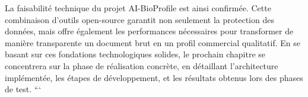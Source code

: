 La faisabilité technique du projet AI-BioProfile est ainsi confirmée. Cette combinaison d'outils open-source garantit non seulement la protection des données, mais offre également les performances nécessaires pour transformer de manière transparente un document brut en un profil commercial qualitatif. En se basant sur ces fondations technologiques solides, le prochain chapitre se concentrera sur la phase de réalisation concrète, en détaillant l'architecture implémentée, les étapes de développement, et les résultats obtenus lors des phases de test.
```